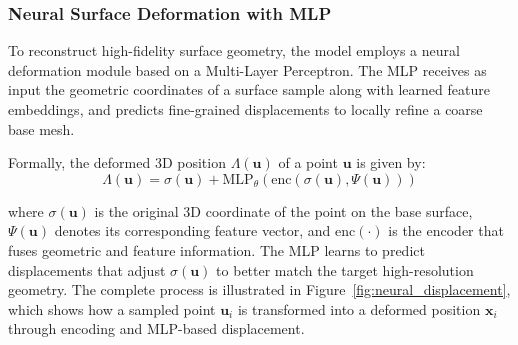 \subsubsection{Neural Surface Deformation with MLP}

To reconstruct high-fidelity surface geometry, the model employs a neural deformation module based on a Multi-Layer Perceptron.  
The MLP receives as input the geometric coordinates of a surface sample along with learned feature embeddings, and predicts fine-grained displacements to locally refine a coarse base mesh.

Formally, the deformed 3D position $\Lambda(\mathbf{u})$ of a point $\mathbf{u}$ is given by:
\begin{equation}
\Lambda(\mathbf{u}) = \sigma(\mathbf{u}) + \text{MLP}_\theta\left( \text{enc}(\sigma(\mathbf{u}), \Psi(\mathbf{u})) \right)
\end{equation}

where $\sigma(\mathbf{u})$ is the original 3D coordinate of the point on the base surface, $\Psi(\mathbf{u})$ denotes its corresponding feature vector, and $\text{enc}(\cdot)$ is the encoder that fuses geometric and feature information.  
The MLP learns to predict displacements that adjust $\sigma(\mathbf{u})$ to better match the target high-resolution geometry.
The complete process is illustrated in Figure~\ref{fig:neural_displacement}, which shows how a sampled point $\mathbf{u}_i$ is transformed into a deformed position $\mathbf{x}_i$ through encoding and MLP-based displacement.

